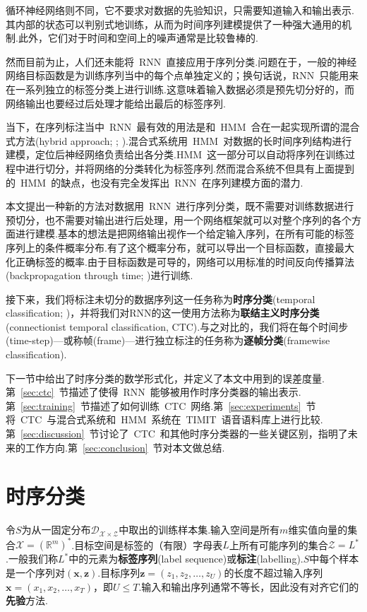 \documentclass{ctexart}
\def\bR{\mathbb{R}}
\def\cD{\mathcal{D}}
\def\cX{\mathcal{X}}
\def\cZ{\mathcal{Z}}
\def\vx{\mathbf{x}}
\def\vz{\mathbf{z}}
\begin{document}
循环神经网络则不同，它不要求对数据的先验知识，只需要知道输入和输出表示.其内部的状态可以判别式地训练，从而为时间序列建模提供了一种强大通用的机制.此外，它们对于时间和空间上的噪声通常是比较鲁棒的.

然而目前为止，人们还未能将~RNN~直接应用于序列分类.问题在于，一般的神经网络目标函数是为训练序列当中的每个点单独定义的；换句话说，RNN~只能用来在一系列独立的标签分类上进行训练.这意味着输入数据必须是预先切分好的，而网络输出也要经过后处理才能给出最后的标签序列.

当下，在序列标注当中~RNN~最有效的用法是和~HMM~合在一起实现所谓的混合式方法(hybrid approach; \citealp{bourlard1994connectionist}; \citealp{bengio1999markovian}).混合式系统用~HMM~对数据的长时间序列结构进行建模，定位后神经网络负责给出各分类.HMM~这一部分可以自动将序列在训练过程中进行切分，并将网络的分类转化为标签序列.然而混合系统不但具有上面提到的~HMM~的缺点，也没有完全发挥出~RNN~在序列建模方面的潜力.

本文提出一种新的方法对数据用~RNN~进行序列分类，既不需要对训练数据进行预切分，也不需要对输出进行后处理，用一个网络框架就可以对整个序列的各个方面进行建模.基本的想法是把网络输出视作一个给定输入序列，在所有可能的标签序列上的条件概率分布.有了这个概率分布，就可以导出一个目标函数，直接最大化正确标签的概率.由于目标函数是可导的，网络可以用标准的时间反向传播算法(backpropagation through time; \citealp{werbos1990bptt})进行训练.

接下来，我们将标注未切分的数据序列这一任务称为\textbf{时序分类}(temporal classification; \citealp{kadous2002temporal})，并将我们对RNN的这一使用方法称为\textbf{联结主义时序分类}(connectionist temporal classification, CTC).与之对比的，我们将在每个时间步(time-step)---或称帧(frame)---进行独立标注的任务称为\textbf{逐帧分类}(framewise classification).

下一节中给出了时序分类的数学形式化，并定义了本文中用到的误差度量.第~\ref{sec:ctc}~节描述了使得~RNN~能够被用作时序分类器的输出表示.第~\ref{sec:training}~节描述了如何训练~CTC~网络.第~\ref{sec:experiments}~节将~CTC~与混合式系统和~HMM~系统在~TIMIT~语音语料库上进行比较.第~\ref{sec:discussion}~节讨论了~CTC~和其他时序分类器的一些关键区别，指明了未来的工作方向.第~\ref{sec:conclusion}~节对本文做总结.
\section{时序分类}
令$S$为从一固定分布$\cD_{\cX\times\cZ}$中取出的训练样本集.输入空间是所有$m$维实值向量的集合$\cX = (\bR^m)^*$.目标空间是标签的（有限）字母表$L$上所有可能序列的集合$\cZ = L^*$.一般我们称$L^*$中的元素为\textbf{标签序列}(label sequence)或\textbf{标注}(labelling).$S$中每个样本是一个序列对$(\vx, \vz)$.目标序列$\vz = (z_1,z_2,\dots, z_U)$的长度不超过输入序列$\vx = (x_1,x_2,\dots,x_T)$，即$U\le T$.输入和输出序列通常不等长，因此没有对齐它们的\textbf{先验}方法.
\end{document}
